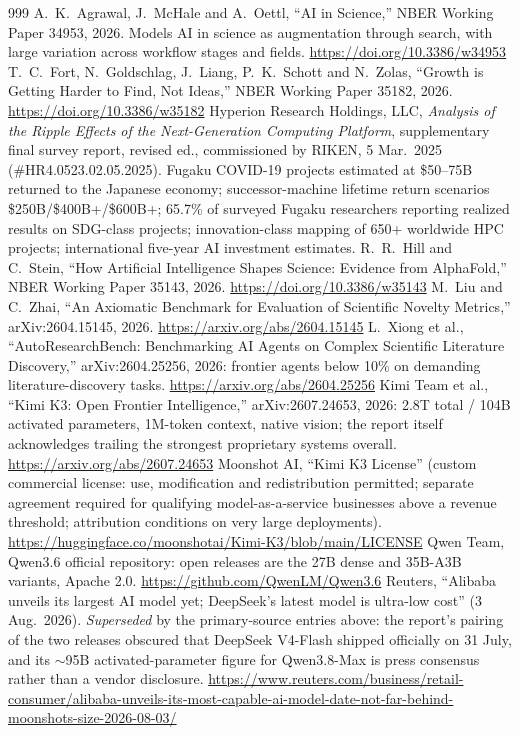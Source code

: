 \begin{thebibliography}{999}
 A.~K.~Agrawal, J.~McHale and A.~Oettl, ``AI in Science,'' NBER Working Paper 34953, 2026. Models AI in science as augmentation through search, with large variation across workflow stages and fields. \url{https://doi.org/10.3386/w34953}
 T.~C.~Fort, N.~Goldschlag, J.~Liang, P.~K.~Schott and N.~Zolas, ``Growth is Getting Harder to Find, Not Ideas,'' NBER Working Paper 35182, 2026. \url{https://doi.org/10.3386/w35182}
 Hyperion Research Holdings, LLC, \emph{Analysis of the Ripple Effects of the Next-Generation Computing Platform}, supplementary final survey report, revised ed., commissioned by RIKEN, 5 Mar.\ 2025 (\#HR4.0523.02.05.2025). Fugaku COVID-19 projects estimated at \$50--75B returned to the Japanese economy; successor-machine lifetime return scenarios \$250B/\$400B+/\$600B+; 65.7\% of surveyed Fugaku researchers reporting realized results on SDG-class projects; innovation-class mapping of 650+ worldwide HPC projects; international five-year AI investment estimates.
 R.~R.~Hill and C.~Stein, ``How Artificial Intelligence Shapes Science: Evidence from AlphaFold,'' NBER Working Paper 35143, 2026. \url{https://doi.org/10.3386/w35143}
 M.~Liu and C.~Zhai, ``An Axiomatic Benchmark for Evaluation of Scientific Novelty Metrics,'' arXiv:2604.15145, 2026. \url{https://arxiv.org/abs/2604.15145}
 L.~Xiong et al., ``AutoResearchBench: Benchmarking AI Agents on Complex Scientific Literature Discovery,'' arXiv:2604.25256, 2026: frontier agents below 10\% on demanding literature-discovery tasks. \url{https://arxiv.org/abs/2604.25256}
 Kimi Team et al., ``Kimi K3: Open Frontier Intelligence,'' arXiv:2607.24653, 2026: 2.8T total / 104B activated parameters, 1M-token context, native vision; the report itself acknowledges trailing the strongest proprietary systems overall. \url{https://arxiv.org/abs/2607.24653}
 Moonshot AI, ``Kimi K3 License'' (custom commercial license: use, modification and redistribution permitted; separate agreement required for qualifying model-as-a-service businesses above a revenue threshold; attribution conditions on very large deployments). \url{https://huggingface.co/moonshotai/Kimi-K3/blob/main/LICENSE}
 Qwen Team, Qwen3.6 official repository: open releases are the 27B dense and 35B-A3B variants, Apache 2.0. \url{https://github.com/QwenLM/Qwen3.6}
 Reuters, ``Alibaba unveils its largest AI model yet; DeepSeek's latest model is ultra-low cost'' (3 Aug.\ 2026). \emph{Superseded} by the primary-source entries above: the report's pairing of the two releases obscured that DeepSeek V4-Flash shipped officially on 31 July, and its $\sim$95B activated-parameter figure for Qwen3.8-Max is press consensus rather than a vendor disclosure. \url{https://www.reuters.com/business/retail-consumer/alibaba-unveils-its-most-capable-ai-model-date-not-far-behind-moonshots-size-2026-08-03/}

\end{thebibliography}
